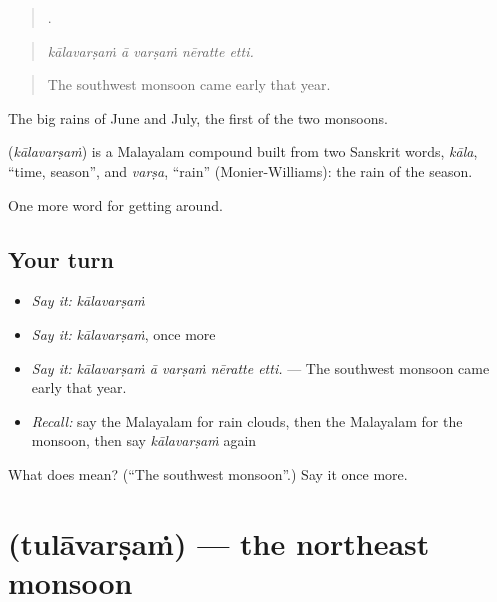 \begin{quote}
    .
\end{quote}

\begin{quote}
\emph{kālavarṣaṁ ā varṣaṁ nēratte etti.}
\end{quote}

\begin{quote}
The southwest monsoon came early that year.
\end{quote}

The big rains of June and July, the first of the two monsoons.

\begin{cousinweb}
\textbf{} (\emph{kālavarṣaṁ}) is a Malayalam compound built from two Sanskrit words, \emph{kāla}, \textquotedblleft{}time, season\textquotedblright{}, and \emph{varṣa}, \textquotedblleft{}rain\textquotedblright{} (Monier-Williams): the rain of the season.
\end{cousinweb}

\begin{grammarlens}[title={What you've built}]
One more word for getting around.
\end{grammarlens}

\subsection*{Your turn}
\begin{itemize}
\raggedright
  \item \emph{Say it:} \emph{kālavarṣaṁ}
  \item \emph{Say it:} \emph{kālavarṣaṁ}, once more
  \item \emph{Say it:} \emph{kālavarṣaṁ ā varṣaṁ nēratte etti.} — The southwest monsoon came early that year.
  \item \emph{Recall:} say the Malayalam for rain clouds, then the Malayalam for the monsoon, then say \emph{kālavarṣaṁ} again
\end{itemize}

\begin{tcolorbox}[breakable,colback=teal!4,colframe=teal!35!black,title={Before you move on}]
What does  mean? (\textquotedblleft{}The southwest monsoon\textquotedblright{}.) Say it once more.
\end{tcolorbox}
\section[\texorpdfstring{\ml{തുലാവർഷം} (tulāvarṣaṁ)}{തുലാവർഷം (tulāvarṣaṁ)}]{ (tulāvarṣaṁ) — the northeast monsoon}

